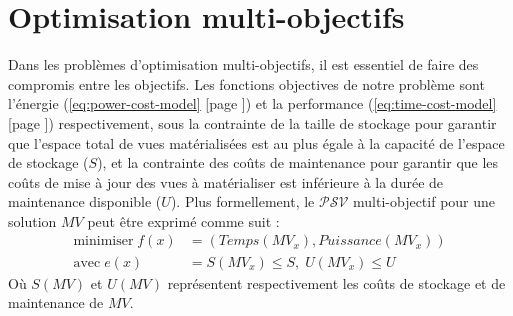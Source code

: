 \section{Optimisation multi-objectifs}\label{sec:Multi-objective}
Dans les problèmes d'optimisation multi-objectifs, il est essentiel de faire des compromis entre les objectifs.
% 
Les fonctions objectives de notre problème sont l'énergie (\ref{eq:power-cost-model} [page \pageref{eq:power-cost-model}]) et la performance (\ref{eq:time-cost-model} [page \pageref{eq:time-cost-model}]) respectivement, sous la contrainte de la taille de stockage pour garantir que l'espace total de vues matérialisées est au plus égale à la capacité de l'espace de stockage ($S$), et la contrainte des coûts de maintenance pour garantir que les coûts de mise à jour des vues à matérialiser est inférieure à la durée de maintenance disponible ($U$). Plus formellement, le $\mathcal{PSV}$ multi-objectif pour une solution $MV$ peut être exprimé comme suit :
\begin{align*}
  \text{minimiser} \; f(x) &= (Temps(MV_x), Puissance(MV_x)) \\
  \text{avec} \; e(x) &= S(MV_x) \leq S,\; U(MV_x) \leq U
\end{align*}
Où $S(MV) $ et $U(MV)$ représentent respectivement les coûts de stockage et de maintenance de $MV$.

